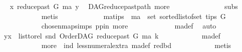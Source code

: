 \begin{isabellebody}
\ \isamarkupfalse%
\ {\isachardoublequoteopen}x\ {\isasymrightarrow}\isactrlsup {\isacharplus}{\kern0pt}\isactrlbsub reduce{\isacharunderscore}{\kern0pt}past\ G\ ma\isactrlesub \ y{\isachardoublequoteclose}\ \isamarkupfalse%
\ DAG{\isachardot}{\kern0pt}reduce{\isacharunderscore}{\kern0pt}past{\isacharunderscore}{\kern0pt}path{}\ more\ \ \isanewline
\ \ \ \ \ \ \ \ \ \ \ \ {}\ subs\isanewline
\ \ \ \ \ \ \ \ \ \ \isamarkupfalse%
\ {\isacharparenleft}{\kern0pt}metis{\isacharparenright}{\kern0pt}\ \isanewline
\ \ \ \ \ \ \ \ \isamarkupfalse%
\ \isamarkupfalse%
\ ma{\isacharunderscore}{\kern0pt}tips{\isacharcolon}{\kern0pt}\ {\isachardoublequoteopen}\ ma\ {\isasymin}\ set\ {\isacharparenleft}{\kern0pt}sorted{\isacharunderscore}{\kern0pt}list{\isacharunderscore}{\kern0pt}of{\isacharunderscore}{\kern0pt}set\ {\isacharparenleft}{\kern0pt}tips\ G{\isacharparenright}{\kern0pt}{\isacharparenright}{\kern0pt}{\isachardoublequoteclose}\ \isanewline
\ \ \ \ \ \ \ \ \ \ \isamarkupfalse%
\ chosen{\isacharunderscore}{\kern0pt}map{\isacharunderscore}{\kern0pt}simps{\isacharparenleft}{\kern0pt}{}{\isacharparenright}{\kern0pt}\ pp{\isacharunderscore}{\kern0pt}in\ more{\isacharparenleft}{\kern0pt}{}{\isacharparenright}{\kern0pt}\ \isanewline
\ \ \ \ \ \ \ \ \ \ \isamarkupfalse%
\ ma{\isacharunderscore}{\kern0pt}def\ \isamarkupfalse%
\ auto\isanewline
\ \ \ \ \ \ \ \ \isamarkupfalse%
\ \isamarkupfalse%
\ {\isachardoublequoteopen}{\isacharparenleft}{\kern0pt}y{\isacharcomma}{\kern0pt}x{\isacharparenright}{\kern0pt}\ {\isasymin}\ list{\isacharunderscore}{\kern0pt}to{\isacharunderscore}{\kern0pt}rel\ {\isacharparenleft}{\kern0pt}snd\ {\isacharparenleft}{\kern0pt}OrderDAG\ {\isacharparenleft}{\kern0pt}reduce{\isacharunderscore}{\kern0pt}past\ G\ ma{\isacharparenright}{\kern0pt}\ k{\isacharparenright}{\kern0pt}{\isacharparenright}{\kern0pt}{\isachardoublequoteclose}\isanewline
\ \ \ \ \ \ \ \ \ \ \isamarkupfalse%
\ ma{\isacharunderscore}{\kern0pt}def\isanewline
\ \ \ \ \ \ \ \ \ \ \isamarkupfalse%
\ more\ {}\ ind\ less{\isacharunderscore}{\kern0pt}numeral{\isacharunderscore}{\kern0pt}extra{\isacharparenleft}{\kern0pt}{}{\isacharparenright}{\kern0pt}\ ma{\isacharunderscore}{\kern0pt}def\ red{\isacharunderscore}{\kern0pt}bd\isanewline
\ \ \ \ \ \ \ \ \ \ \isamarkupfalse%
\ {\isacharparenleft}{\kern0pt}metis{\isacharparenright}{\kern0pt}\isanewline

\end{isabellebody}

